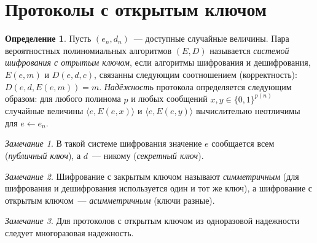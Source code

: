 \documentclass[12pt,a4paper]{article}
\newcommand{\bits}{\{0,1\}}
\theoremstyle{definition}
\newtheorem{definition}{Определение}[section]
\theoremstyle{plain}
\theoremstyle{remark}
\newtheorem{remark}{Замечание}[section]
\begin{document}
\section{Протоколы с открытым ключом}
\begin{definition}
Пусть $(e_n, d_n)$~--- доступные случайные величины. Пара вероятностных 
полиномиальных алгоритмов $(E,D)$ называется 
\emph{системой шифрования с отрытым ключом}, если 
алгоритмы шифрования и дешифрования, $E(e,m)$ и $D(e,d,c)$, связанны
следующим соотношением (корректность):
$D(e, d, E(e, m)) = m$.
\emph{Надёжность} протокола определяется следующим
образом: для любого полинома $p$
и любых сообщений
$x,y\in\bits^{p(n)}$ случайные величины $\langle e, E(e, x)\rangle$ и $\langle e,E(e, y)\rangle$
вычислительно неотличимы для $e\gets e_n$.
\end{definition}

\begin{remark}
В такой системе шифрования значение $e$ сообщается всем (\emph{публичный ключ}), 
а $d$~--- никому (\emph{секретный ключ}). 
\end{remark}

\begin{remark}
Шифрование с закрытым ключом называют \emph{симметричным} (для шифрования и дешифрования используется один и тот же ключ), а шифрование с открытым ключом~--- \emph{асимметричным} (ключи разные). 
\end{remark}

\begin{remark}
Для протоколов с открытым ключом из одноразовой надежности следует многоразовая надежность.
\end{remark}
\end{document}
